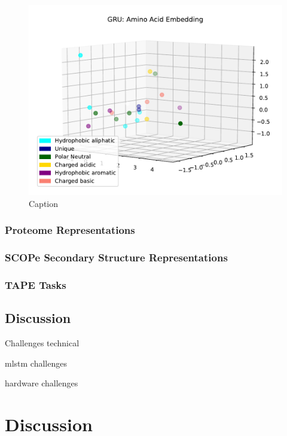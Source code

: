 \documentclass[a4paper,12pt]{article}
\begin{document}
\begin{figure}
    \centering
    \includegraphics{figures/fig2a_GRU.pdf}
    \caption{Caption}
    \label{fig:fig2a_GRU}
\end{figure}

\subsubsection{Proteome Representations}

\subsubsection{SCOPe Secondary Structure Representations}

\subsubsection{TAPE Tasks}

\subsection{Discussion}
Challenges technical

mlstm challenges

hardware challenges

\clearpage
\section{Discussion}

\end{document}
